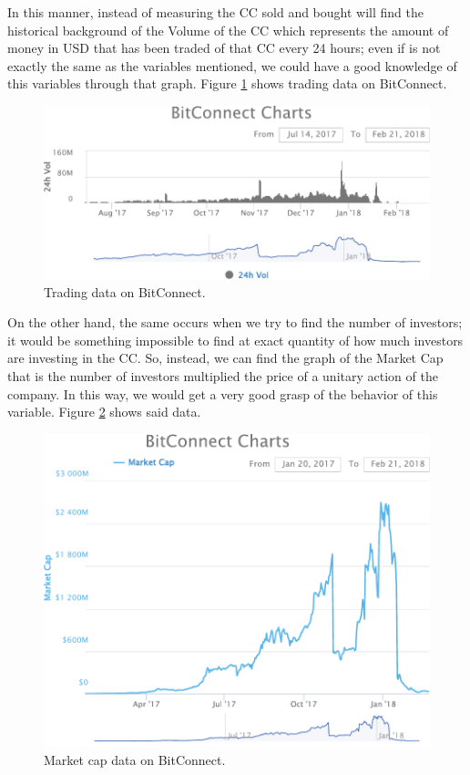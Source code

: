 \noindent In this manner, instead of measuring the CC sold and bought will find the historical background of the Volume of the CC which represents the amount of money in USD that has been traded of that CC every 24 hours; even if is not exactly the same as the variables mentioned, we could have a good knowledge of this variables through that graph. Figure \ref{img-trading} shows trading data on BitConnect.
\begin{figure}[H]
	\centering
    \includegraphics[scale=0.8]{files/Trading.pdf}
    \caption{Trading data on BitConnect.}
    \label{img-trading}
\end{figure}

\noindent On the other hand, the same occurs when we try to find the number of investors; it would be something impossible to find at exact quantity of how much investors are investing in the CC. So, instead, we can find the graph of the Market Cap that is the number of investors multiplied the price of a unitary action of the company. In this way, we would get a very good grasp of the behavior of this variable. Figure \ref{img-marketcap} shows said data.

\begin{figure}[H]
	\centering
    \includegraphics[scale=0.7]{files/Market_Cap.pdf}
    \caption{Market cap data on BitConnect.}
    \label{img-marketcap}
\end{figure}

